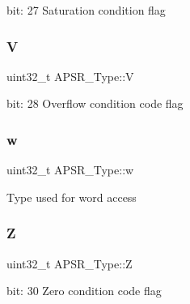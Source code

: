 bit\+: 27 Saturation condition flag \mbox{\label{union_a_p_s_r___type_a8004d224aacb78ca37774c35f9156e7e}} 
\subsubsection{\texorpdfstring{V}{V}}
{\footnotesize\ttfamily uint32\+\_\+t A\+P\+S\+R\+\_\+\+Type\+::V}

bit\+: 28 Overflow condition code flag \mbox{\label{union_a_p_s_r___type_ae4c2ef8c9430d7b7bef5cbfbbaed3a94}} 
\subsubsection{\texorpdfstring{w}{w}}
{\footnotesize\ttfamily uint32\+\_\+t A\+P\+S\+R\+\_\+\+Type\+::w}

Type used for word access \mbox{\label{union_a_p_s_r___type_a3b04d58738b66a28ff13f23d8b0ba7e5}} 
\subsubsection{\texorpdfstring{Z}{Z}}
{\footnotesize\ttfamily uint32\+\_\+t A\+P\+S\+R\+\_\+\+Type\+::Z}

bit\+: 30 Zero condition code flag 

